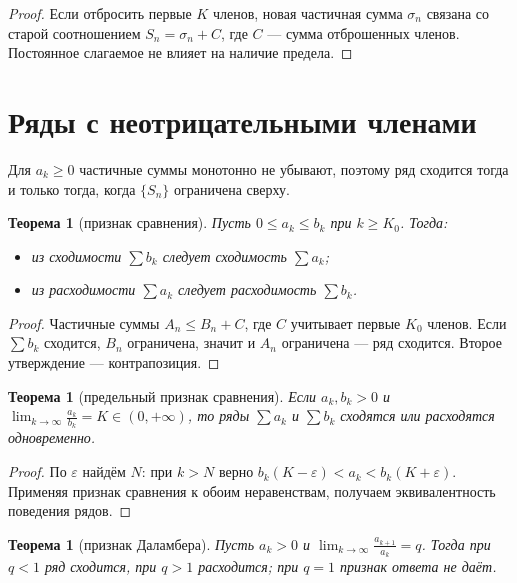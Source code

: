 \documentclass[11pt,a4paper]{article}
\theoremstyle{definition}
\theoremstyle{plain}
\newtheorem{theorem}[definition]{Теорема}
\newcommand{\eps}{\varepsilon}
\renewcommand{\le}{\leqslant}
\renewcommand{\ge}{\geqslant}
\begin{document}
\begin{proof}
Если отбросить первые $K$ членов, новая частичная сумма $\sigma_n$ связана со старой соотношением
$S_n=\sigma_n+C$, где $C$ — сумма отброшенных членов. Постоянное слагаемое не влияет на наличие
предела.
\end{proof}

\section{Ряды с неотрицательными членами}

Для $a_k\ge0$ частичные суммы монотонно не убывают, поэтому ряд сходится тогда и только тогда,
когда $\{S_n\}$ ограничена сверху.

\begin{theorem}[признак сравнения]
Пусть $0\le a_k\le b_k$ при $k\ge K_0$. Тогда:
\begin{itemize}[leftmargin=*]
  \item из сходимости $\sum b_k$ следует сходимость $\sum a_k$;
  \item из расходимости $\sum a_k$ следует расходимость $\sum b_k$.
\end{itemize}
\end{theorem}

\begin{proof}
Частичные суммы $A_n\le B_n+C$, где $C$ учитывает первые $K_0$ членов. Если $\sum b_k$ сходится,
$B_n$ ограничена, значит и $A_n$ ограничена — ряд сходится. Второе утверждение — контрапозиция.
\end{proof}

\begin{theorem}[предельный признак сравнения]
Если $a_k,b_k>0$ и $\displaystyle\lim_{k\to\infty}\frac{a_k}{b_k}=K\in(0,+\infty)$, то ряды
$\sum a_k$ и $\sum b_k$ сходятся или расходятся одновременно.
\end{theorem}

\begin{proof}
По $\eps$ найдём $N$: при $k>N$ верно $b_k(K-\eps)<a_k<b_k(K+\eps)$. Применяя признак сравнения к
обоим неравенствам, получаем эквивалентность поведения рядов.
\end{proof}

\begin{theorem}[признак Даламбера]
Пусть $a_k>0$ и $\displaystyle\lim_{k\to\infty}\frac{a_{k+1}}{a_k}=q$. Тогда при $q<1$ ряд
сходится, при $q>1$ расходится; при $q=1$ признак ответа не даёт.
\end{theorem}
\end{document}
